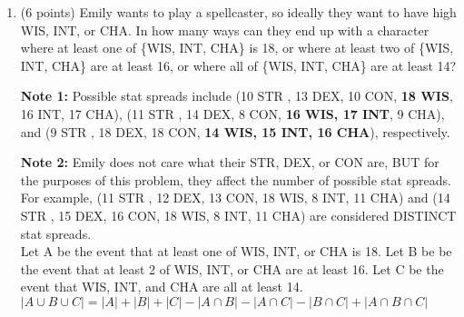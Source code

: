 \documentclass[10pt,letterpaper,unboxed,cm]{article}
\begin{document}
\begin{enumerate}
\begin{enumerate}
        \item (6 points) Emily wants to play a spellcaster, so ideally they want to have high WIS, INT, or CHA. In how many ways can they end up with a character where at least one of \{WIS, INT, CHA\} is 18, or where at least two of \{WIS, INT, CHA\} are at least 16, or where all of \{WIS, INT, CHA\} are at least 14? 
        \bigskip
        
        {\bf Note 1:} Possible stat spreads include (10 STR , 13 DEX, 10 CON, {\bf 18 WIS}, 16 INT, 17 CHA), (11 STR , 14 DEX, 8 CON, {\bf 16 WIS, 17 INT}, 9 CHA), and (9 STR , 18 DEX, 18 CON, {\bf 14 WIS, 15 INT, 16 CHA}), respectively. 
        \bigskip
        
        {\bf Note 2:} Emily does not care what their STR, DEX, or CON are, BUT for the purposes of this problem, they affect the number of possible stat spreads. For example, (11 STR , 12 DEX, 13 CON, 18 WIS, 8 INT, 11 CHA) and (14 STR , 15 DEX, 16 CON, 18 WIS, 8 INT, 11 CHA) are considered DISTINCT stat spreads.
        \\
        Let A be the event that at least one of WIS, INT, or CHA is 18. Let B be be the event that at least 2 of WIS, INT, or CHA are at least 16. Let C be the event that WIS, INT, and CHA are all at least 14.\\
        $|A \cup B \cup C| = |A| + |B| + |C| - |A \cap B| - |A \cap C| - |B \cap C| + |A \cap B \cap C|$\\
        

\end{enumerate}
\end{enumerate}
\end{document}
